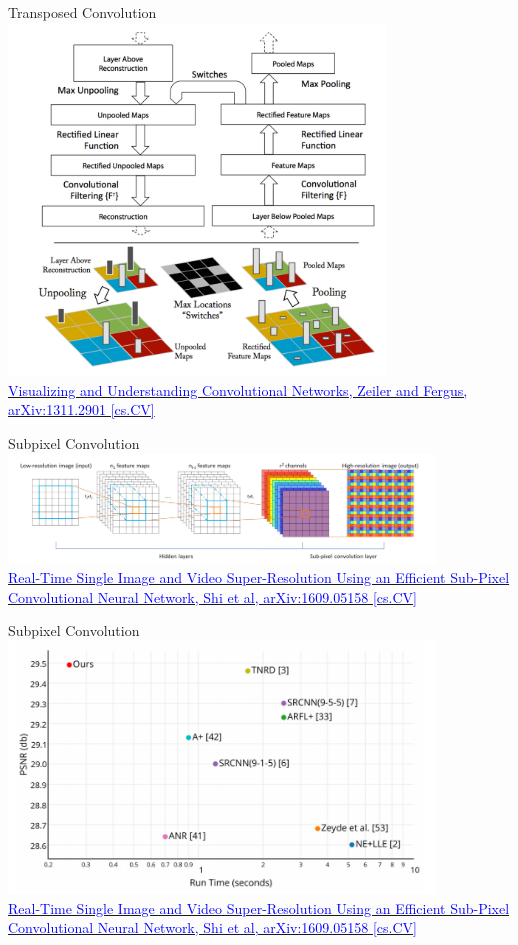 \documentclass[]{beamer}
\begin{document}
\begin{frame}{Transposed Convolution}
\centering
\includegraphics[width=0.75\textwidth]{figures/zeiler-transposed} \\
\href{https://arxiv.org/abs/1311.2901}
{\textcolor{blue}{Visualizing and Understanding Convolutional Networks, Zeiler and Fergus, arXiv:1311.2901 [cs.CV]}}
\end{frame}


\begin{frame}{Subpixel Convolution}
\centering
\includegraphics[width=0.85\textwidth]{figures/shi-subpixel} \\
\href{https://arxiv.org/abs/1609.05158}
{\textcolor{blue}{Real-Time Single Image and Video Super-Resolution Using an Efficient Sub-Pixel Convolutional Neural Network, Shi et al, arXiv:1609.05158 [cs.CV]}}
\end{frame}


\begin{frame}{Subpixel Convolution}
\centering
\includegraphics[width=0.85\textwidth]{figures/shi-subpixel-trade-off} \\
\href{https://arxiv.org/abs/1609.05158}
{\textcolor{blue}{Real-Time Single Image and Video Super-Resolution Using an Efficient Sub-Pixel Convolutional Neural Network, Shi et al, arXiv:1609.05158 [cs.CV]}}
\end{frame}
\end{document}
